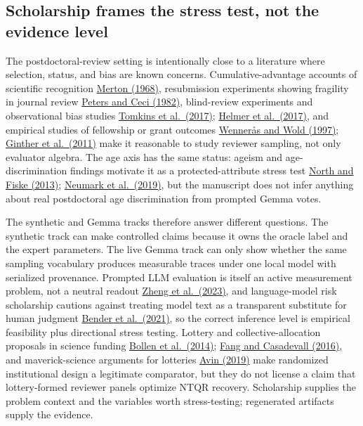 \documentclass[
]{article}
\begin{document}
\subsection{Scholarship frames the stress test, not the evidence
level}\label{scholarship-frames-the-stress-test-not-the-evidence-level}

The postdoctoral-review setting is intentionally close to a literature
where selection, status, and bias are known concerns.
Cumulative-advantage accounts of scientific recognition
\href{https://doi.org/10.1126/science.159.3810.56}{Merton (1968)},
resubmission experiments showing fragility in journal review
\href{https://doi.org/10.1017/S0140525X00011183}{Peters and Ceci
(1982)}, blind-review experiments and observational bias studies
\href{https://doi.org/10.1073/pnas.1707323114}{Tomkins et al.~(2017)};
\href{https://doi.org/10.7554/eLife.21718}{Helmer et al.~(2017)}, and
empirical studies of fellowship or grant outcomes
\href{https://doi.org/10.1038/387341a0}{Wennerås and Wold (1997)};
\href{https://doi.org/10.1126/science.1196783}{Ginther et al.~(2011)}
make it reasonable to study reviewer sampling, not only evaluator
algebra. The age axis has the same status: ageism and age-discrimination
findings motivate it as a protected-attribute stress test
\href{https://doi.org/10.1177/0146167213480043}{North and Fiske (2013)};
\href{https://doi.org/10.1086/701029}{Neumark et al.~(2019)}, but the
manuscript does not infer anything about real postdoctoral age
discrimination from prompted Gemma votes.

The synthetic and Gemma tracks therefore answer different questions. The
synthetic track can make controlled claims because it owns the oracle
label and the expert parameters. The live Gemma track can only show
whether the same sampling vocabulary produces measurable traces under
one local model with serialized provenance. Prompted LLM evaluation is
itself an active measurement problem, not a neutral readout
\href{https://arxiv.org/abs/2306.05685}{Zheng et al.~(2023)}, and
language-model risk scholarship cautions against treating model text as
a transparent substitute for human judgment
\href{https://doi.org/10.1145/3442188.3445922}{Bender et al.~(2021)}, so
the correct inference level is empirical feasibility plus directional
stress testing. Lottery and collective-allocation proposals in science
funding \href{https://doi.org/10.1002/embr.201338068}{Bollen et
al.~(2014)}; \href{https://doi.org/10.1128/mBio.00422-16}{Fang and
Casadevall (2016)}, and maverick-science arguments for lotteries
\href{https://doi.org/10.1016/j.shpsa.2018.11.006}{Avin (2019)} make
randomized institutional design a legitimate comparator, but they do not
license a claim that lottery-formed reviewer panels optimize NTQR
recovery. Scholarship supplies the problem context and the variables
worth stress-testing; regenerated artifacts supply the evidence.
\end{document}
